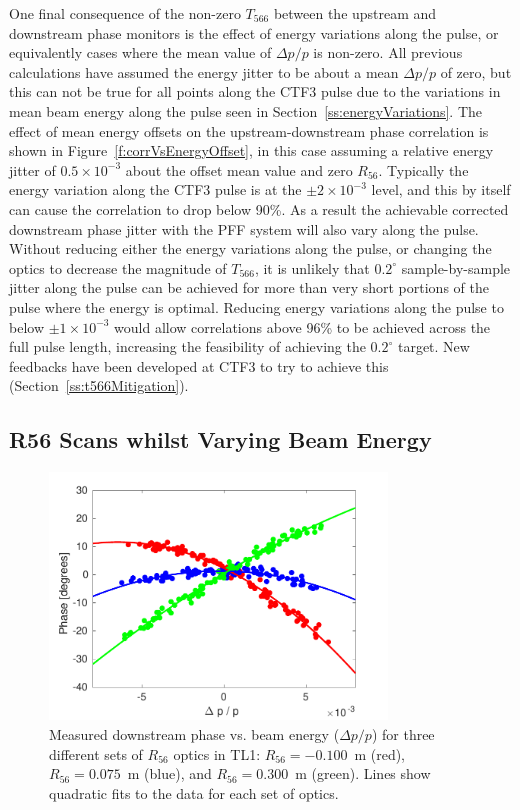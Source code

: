 One final consequence of the non-zero \(T_{566}\) between the upstream and downstream phase monitors is the effect of energy variations along the pulse, or equivalently cases where the mean value of \(\Delta p/p\) is non-zero. All previous calculations have assumed the energy jitter to be about a mean \(\Delta p / p\) of zero, but this can not be true for all points along the CTF3 pulse due to the variations in mean beam energy along the pulse seen in Section~\ref{ss:energyVariations}. The effect of mean energy offsets on the upstream-downstream phase correlation is shown in Figure~\ref{f:corrVsEnergyOffset}, in this case assuming a relative energy jitter of \(0.5\times10^{-3}\) about the offset mean value and zero \(R_{56}\). Typically the energy variation along the CTF3 pulse is at the \(\pm2\times10^{-3}\) level, and this by itself can cause the correlation to drop below 90\%. As a result the achievable corrected downstream phase jitter with the PFF system will also vary along the pulse. Without reducing either the energy variations along the pulse, or changing the optics to decrease the magnitude of \(T_{566}\), it is unlikely that \(0.2^\circ\) sample-by-sample jitter along the pulse can be achieved for more than very short portions of the pulse where the energy is optimal. Reducing energy variations along the pulse to below \(\pm1 \times10^{-3}\) would allow correlations above 96\% to be achieved across the full pulse length, increasing the feasibility of achieving the \(0.2^\circ\) target. New feedbacks have been developed at CTF3 to try to achieve this (Section~\ref{ss:t566Mitigation}).



\subsection{R56 Scans whilst Varying Beam Energy}
\label{ss:r56ScanWithEnergy}


\begin{figure}
  \centering
  \includegraphics[width=0.8\textwidth]{Figures/propagation/R56ScanGunWiggle_PhaseVsEnergy}
  \caption{Measured downstream phase vs. beam energy (\(\Delta p/p\)) for three different sets of \(R_{56}\) optics in TL1: \(R_{56}=-0.100\)~m (red), \(R_{56}=0.075\)~m (blue), and \(R_{56}=0.300\)~m (green). Lines show quadratic fits to the data for each set of optics.}
  \label{f:R56ScanGunWiggle_PhaseVsEnergy}
\end{figure}


